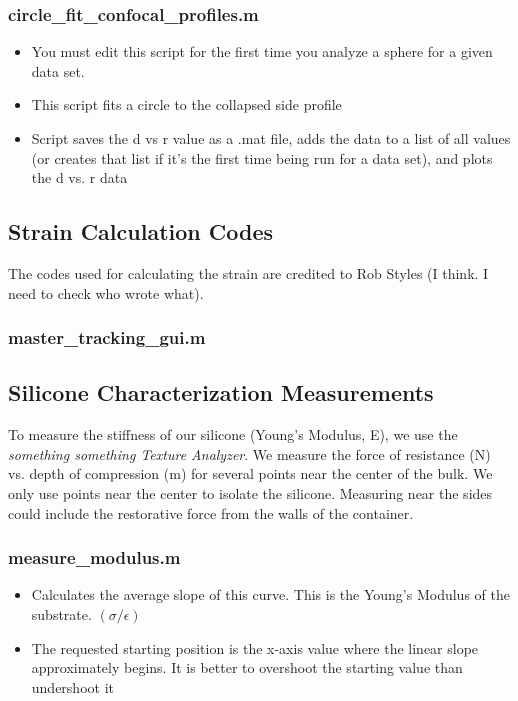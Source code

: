 \subsubsection*{circle\_fit\_confocal\_profiles.m}
\begin{itemize}
	\item You must edit this script for the first time you analyze a sphere for a given data set.
	\item This script fits a circle to the collapsed side profile
	\item Script saves the d vs r value as a .mat file, adds the \code{[d,r]} data to a list of all \code{[d,r]} values (or creates that list if it's the first time being run for a data set), and plots the d vs. r data
\end{itemize}

\subsection{Strain Calculation Codes}
The codes used for calculating the strain are credited to Rob Styles (I think. I need to check who wrote what).  

\subsubsection{master\_tracking\_gui.m}


\subsection{Silicone Characterization Measurements}
To measure the stiffness of our silicone (Young's Modulus, E), we use the \emph{something something Texture Analyzer}. We measure the force of resistance (N) vs. depth of compression (m) for several points near the center of the bulk. We only use points near the center to isolate the silicone. Measuring near the sides could include the restorative force from the walls of the container.
\subsubsection*{measure\_modulus.m}
\begin{itemize}
	\item Calculates the average slope of this curve. This is the Young's Modulus of the substrate.  $(\sigma/\epsilon)$
	\item The requested starting position is the x-axis value where the linear slope approximately begins. It is better to overshoot the starting value than undershoot it
\end{itemize}

